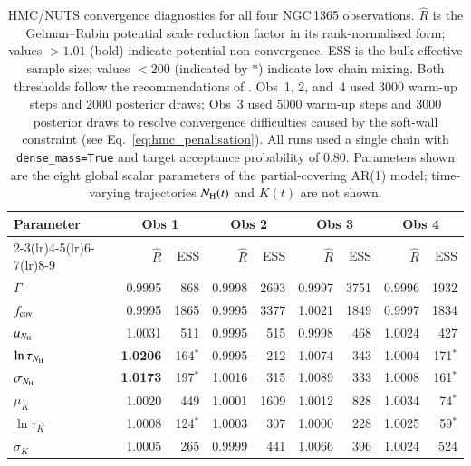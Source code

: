 \documentclass{aa}
\begin{document}
\begin{table}[ht]
  \centering
  \caption{HMC/NUTS convergence diagnostics for all four NGC\,1365
    observations. $\hat{R}$ is the Gelman--Rubin potential scale
    reduction factor \citep{Gelman1992} in its rank-normalised form;
    values $>1.01$ (bold) indicate potential non-convergence. ESS is
    the bulk effective sample size; values $<200$ (indicated by $\ast$)
    indicate low chain mixing. Both thresholds follow the
    recommendations of \citet{Vehtari2021}.
    Obs~1, 2, and~4 used 3000 warm-up steps and 2000 posterior
    draws; Obs~3 used 5000 warm-up steps and 3000 posterior draws
    to resolve convergence difficulties caused by the soft-wall
    constraint (see Eq.~\ref{eq:hmc_penalisation}).
    All runs used a single chain with \texttt{dense\_mass=True}
    and target acceptance probability of 0.80.
    Parameters shown are the eight global scalar parameters of the
    partial-covering AR(1) model; time-varying trajectories
    $N_{\rm H}(t)$ and $K(t)$ are not shown.}
  \label{tab:hmc_ngc1365_convergence}
  \begin{tabular}{l rr rr rr rr}
    \hline\hline
    Parameter & \multicolumn{2}{c}{Obs 1} & \multicolumn{2}{c}{Obs 2} & \multicolumn{2}{c}{Obs 3} & \multicolumn{2}{c}{Obs 4} \\
    \cmidrule(lr){2-3}\cmidrule(lr){4-5}\cmidrule(lr){6-7}\cmidrule(lr){8-9}
               & $\hat{R}$ & ESS & $\hat{R}$ & ESS & $\hat{R}$ & ESS & $\hat{R}$ & ESS \\
    \hline
    $\Gamma$                  & 0.9995          & 868           & 0.9998 & 2693          & 0.9997 & 3751          & 0.9996 & 1932          \\
    $f_{\rm cov}$             & 0.9995          & 1865          & 0.9995 & 3377          & 1.0021 & 1849          & 0.9997 & 1834          \\
    $\mu_{N_{\rm H}}$         & 1.0031          & 511           & 0.9995 & 515           & 0.9998 & 468           & 1.0024 & 427           \\
    $\ln\tau_{N_{\rm H}}$     & \textbf{1.0206} & 164$^{\ast}$  & 0.9995 & 212           & 1.0074 & 343           & 1.0004 & 171$^{\ast}$  \\
    $\sigma_{N_{\rm H}}$      & \textbf{1.0173} & 197$^{\ast}$  & 1.0016 & 315           & 1.0089 & 333           & 1.0008 & 161$^{\ast}$  \\
    $\mu_K$                   & 1.0020          & 449           & 1.0001 & 1609          & 1.0012 & 828           & 1.0034 & 74$^{\ast}$   \\
    $\ln\tau_K$               & 1.0008          & 124$^{\ast}$  & 1.0003 & 307           & 1.0000 & 228           & 1.0025 & 59$^{\ast}$   \\
    $\sigma_K$                & 1.0005          & 265           & 0.9999 & 441           & 1.0066 & 396           & 1.0024 & 524           \\
    \hline\hline
  \end{tabular}
\end{table}
\end{document}
